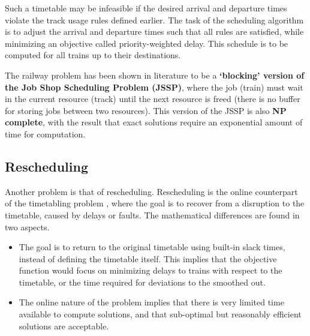  \vspace{0.2cm}
 Such a timetable may be infeasible if the desired arrival and
departure times violate the track usage rules defined earlier.
The task of the scheduling algorithm is to adjust the arrival
and departure times such that all rules are satisfied, while
minimizing an objective called priority-weighted delay. This schedule
is to be computed for all trains up to their destinations.

\vspace{0.2cm}
The railway problem has been shown in literature to be a \textbf{‘blocking’ version of the 
Job Shop Scheduling Problem (JSSP)}, where the job (train) must wait in the current resource 
(track) until the next resource is freed (there is no buﬀer for storing jobs between 
two resources). This version of the JSSP is also \textbf{NP complete}, with the result that 
exact solutions require an exponential amount of time for computation.
\vspace{1in}
\subsection{Rescheduling}

Another problem is that of rescheduling.
Rescheduling is the online counterpart of the timetabling problem , 
where the goal is to recover from a disruption to the timetable, 
caused by delays or faults. The mathematical diﬀerences are found in two aspects. 
\begin{itemize}
\item The goal is to return to the original timetable using built-in slack times, 
instead of deﬁning the timetable itself. 
This implies that the objective function would focus on minimizing delays to 
trains with respect to the timetable, or the time required for deviations to the smoothed out. 
\item The online nature of the problem implies that there is very limited time 
available to compute solutions, and that sub-optimal but reasonably eﬃcient 
solutions are acceptable. 
\end{itemize}


